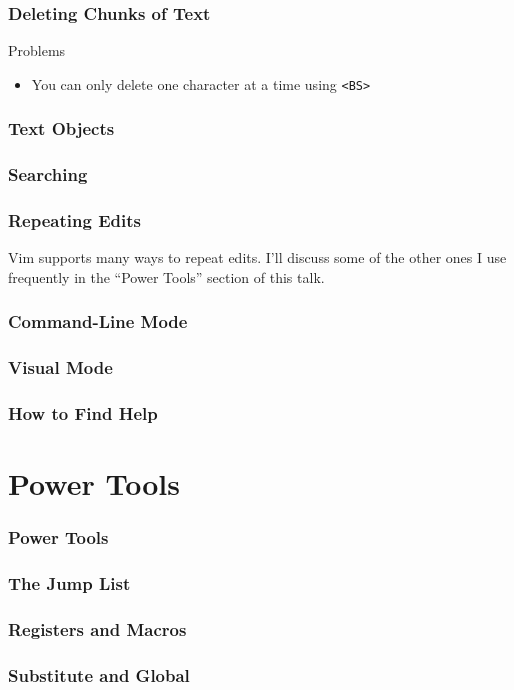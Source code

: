 \documentclass{beamer}
\begin{document}
\begin{frame}[fragile]
    \frametitle{Deleting Chunks of Text}
    \begin{block}{Problems}
	\begin{itemize}
	    \item You can only delete one character at a time using \verb+<BS>+
	\end{itemize}
    \end{block}
\end{frame}

\begin{frame}
    \frametitle{Text Objects}
\end{frame}

\begin{frame}
    \frametitle{Searching}
\end{frame}

\begin{frame}
    \frametitle{Repeating Edits}
    Vim supports many ways to repeat edits. I'll discuss some of the other ones I use frequently in the \enquote{Power Tools} section of this talk.
\end{frame}

\begin{frame}
    \frametitle{Command-Line Mode}
\end{frame}

\begin{frame}
    \frametitle{Visual Mode}
\end{frame}

\begin{frame}
    \frametitle{How to Find Help}
\end{frame}

\section{Power Tools}

\begin{frame}
    \frametitle{Power Tools}
    \tableofcontents[currentsection]
\end{frame}

\begin{frame}
    \frametitle{The Jump List}
\end{frame}

\begin{frame}
    \frametitle{Registers and Macros}
\end{frame}

\begin{frame}
    \frametitle{Substitute and Global}
\end{frame}
\end{document}
